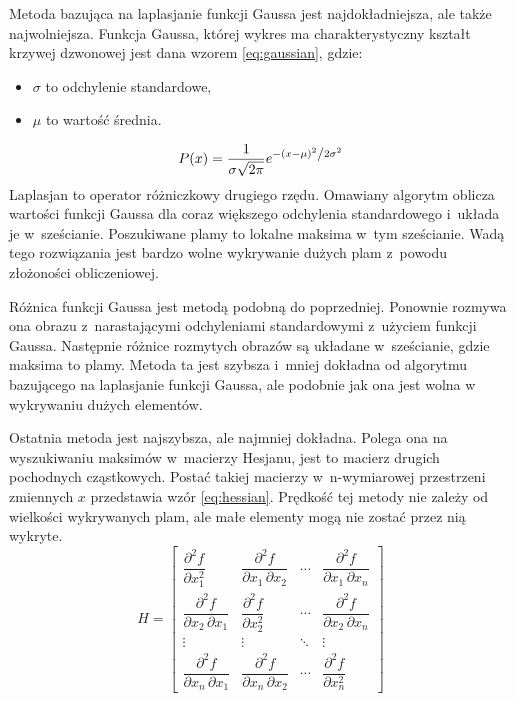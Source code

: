 Metoda bazująca na laplasjanie funkcji Gaussa jest najdokładniejsza, ale
także najwolniejsza.
Funkcja Gaussa, której wykres ma charakterystyczny kształt krzywej dzwonowej
jest dana wzorem \ref{eq:gaussian}, gdzie:
\begin{itemize}
	\item $ \sigma $ to odchylenie standardowe,
	\item $ \mu $ to wartość średnia.
\end{itemize}
\begin{equation}
	P(x) = \frac{1}{{\sigma \sqrt {2\pi } }}
	e^{{{ - \left( {x - \mu } \right)^2 }
	\mathord{\left/ {\vphantom {{ - \left( {x - \mu } \right)^2 }
	{2\sigma ^2 }}} \right. \kern-\nulldelimiterspace} {2\sigma ^2 }}}
\label{eq:gaussian}
\end{equation}
Laplasjan to operator różniczkowy drugiego rzędu.
Omawiany algorytm oblicza wartości funkcji Gaussa dla coraz większego
odchylenia standardowego i~układa je w~sześcianie.
Poszukiwane plamy to lokalne maksima w~tym sześcianie.
Wadą tego rozwiązania jest bardzo wolne wykrywanie dużych plam z~powodu
złożoności obliczeniowej.

Różnica funkcji Gaussa jest metodą podobną do poprzedniej.
Ponownie rozmywa ona obrazu z~narastającymi odchyleniami standardowymi
z~użyciem funkcji Gaussa.
Następnie różnice rozmytych obrazów są układane w~sześcianie, gdzie
maksima to plamy.
Metoda ta jest szybsza i~mniej dokładna od algorytmu bazującego na laplasjanie
funkcji Gaussa, ale podobnie jak ona jest wolna w wykrywaniu dużych elementów.

Ostatnia metoda jest najszybsza, ale najmniej dokładna.
Polega ona na wyszukiwaniu maksimów w~macierzy Hesjanu, jest to macierz
drugich pochodnych cząstkowych.
Postać takiej macierzy w~n-wymiarowej przestrzeni zmiennych $ x $ przedstawia
wzór \ref{eq:hessian}.
Prędkość tej metody nie zależy od wielkości wykrywanych plam, ale małe
elementy mogą nie zostać przez nią wykryte.
\begin{equation}
	H = \begin{bmatrix}
	\dfrac{\partial^2 f}{\partial x_1^2} & 
	\dfrac{\partial^2 f}{\partial x_1\,\partial x_2} & 
	\cdots & \dfrac{\partial^2 f}{\partial x_1\,\partial x_n} \\[2.2ex]
	\dfrac{\partial^2 f}{\partial x_2\,\partial x_1} &
	\dfrac{\partial^2 f}{\partial x_2^2} &
	\cdots & \dfrac{\partial^2 f}{\partial x_2\,\partial x_n} \\[2.2ex]
	\vdots & \vdots & \ddots & \vdots \\[2.2ex]
	\dfrac{\partial^2 f}{\partial x_n\,\partial x_1} &
	\dfrac{\partial^2 f}{\partial x_n\,\partial x_2} &
	\cdots &
	\dfrac{\partial^2 f}{\partial x_n^2}
	\end{bmatrix}
\label{eq:hessian}
\end{equation}

